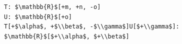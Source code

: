 \documentclass[border=10pt]{standalone}
\begin{document}
\begin{lstlisting}
T: $\mathbb{R}$[+m, +n, -o]
U: $\mathbb{R}$[+o]
T[+$\alpha$, +$\\beta$, -$\\gamma$]U[$+\\gamma$]: $\mathbb{R}$[$+\\alpha$, $+\\beta$]
\end{lstlisting}
\end{document}
